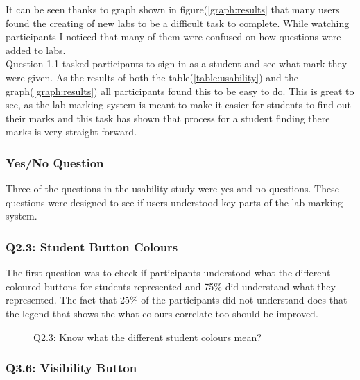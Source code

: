 \documentclass[12pt]{article}  %
\begin{document}
\noindent It can be seen thanks to graph shown in figure(\ref{graph:results} that many users found the creating of new labs to be a difficult task to complete. While watching participants  I noticed that many of them were confused on how questions were added to labs.\\ 

\noindent Question 1.1 tasked participants to sign in as a student and see what mark they were given. As the results of both the table(\ref{table:usability}) and the graph(\ref{graph:results}) all participants found this to be easy to do. This is great to see, as the lab marking system is meant to make it easier for students to find out their marks and this task has shown that process for a student finding there marks is very straight forward.


\subsubsection*{Yes/No Question}
Three of the questions in the usability study were yes and no questions. These questions were designed to see if users understood key parts of the lab marking system.

\subsubsection*{Q2.3: Student Button Colours}

The first question was to check if participants understood what the different coloured buttons for students represented and 75\% did understand what they represented. The fact that 25\% of the participants did not understand does that the legend that shows the what colours correlate too should be improved.

\begin{figure}[H]
\caption{Q2.3: Know what the different student colours mean?}


\end{figure}

\subsubsection*{Q3.6: Visibility Button}
\end{document}
